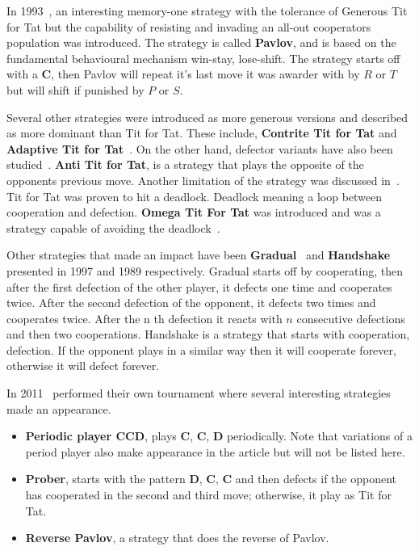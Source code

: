 \documentclass{article}
\begin{document}
In 1993~\cite{Nowak1993}, an interesting memory-one  strategy with the 
tolerance of Generous Tit for Tat but the capability of resisting and invading
an all-out cooperators population was introduced. The strategy is called \textbf{Pavlov},
and is based on the fundamental behavioural mechanism win-stay, lose-shift.
The strategy starts off with a \textbf{C}, then Pavlov will repeat it's last 
move it was awarder with by \(R\) or \(T\) but will shift if punished by \(P\) or \(S\).

Several other strategies were introduced as more generous versions and 
described as more dominant than Tit for Tat. These include, \textbf{Contrite Tit for Tat}
\cite{Wu1995} and \textbf{Adaptive Tit for Tat}~\cite{tzafestas-2000a}. On the
other hand, defector variants have also been studied~\cite{Hilde2013}.
\textbf{Anti Tit for Tat}, is a strategy that plays the opposite of the opponents
previous move. Another limitation of the strategy was discussed in~\cite{Wolfgang2006}.
Tit for Tat was proven to hit a deadlock. Deadlock meaning a loop between 
cooperation and defection. \textbf{Omega Tit For Tat} was introduced and was
a strategy capable of avoiding the deadlock~\cite{Wolfgang2006}.

Other strategies that made an impact have been \textbf{Gradual}~\cite{Beaufils1997}
and \textbf{Handshake}~\cite{Robson1989} presented in 1997 and 1989 respectively.
Gradual starts off by cooperating, then after the first defection of the other player, 
it defects one time and cooperates twice. After the second defection of the opponent,
it defects two times and cooperates twice. After the n th defection it reacts with 
\(n\) consecutive defections and then two cooperations. 
Handshake is a strategy that starts with cooperation, defection. If the opponent plays in
a similar way then it will cooperate forever, otherwise it will defect forever.

In 2011~\cite{Li2011} performed their own tournament where several interesting
strategies made an appearance. 

\begin{itemize}
    \item \textbf{Periodic player CCD}, plays \textbf{C}, \textbf{C}, \textbf{D} 
    periodically. Note that variations of a period player also make appearance
    in the article but will not be listed here.
    \item \textbf{Prober}, starts with the pattern \textbf{D}, \textbf{C}, \textbf{C}
     and then defects if the opponent has cooperated in the second and third move;
     otherwise, it play as Tit for Tat.
    \item \textbf{Reverse Pavlov}, a strategy that does the reverse of Pavlov.
\end{itemize}
\end{document}

